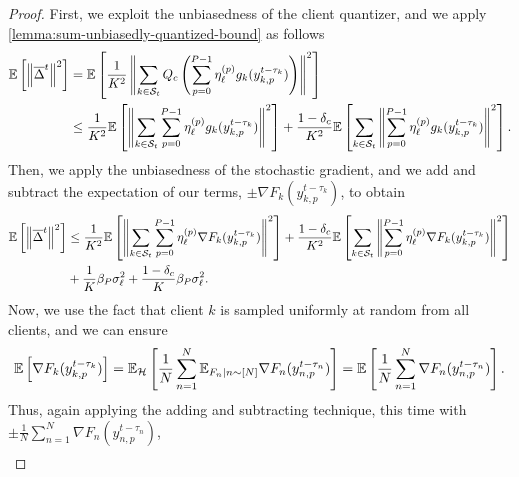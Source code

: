 \begin{proof}
    First, we exploit the unbiasedness of the client quantizer, and we apply \cref{lemma:sum-unbiasedly-quantized-bound} as follows
    \begin{equation}
        \begin{aligned}
            \mathbb{E}\left[ \left\lVert \overline{\Delta}^t \right\rVert^2 \right]
             & = \mathbb{E}\left[\frac{1}{K^2}  \left\lVert\sum_{k\in \mathcal{S}_t} Q_c \left( \sum_{p=0}^{P-1} \eta^{(p)}_{\ell} g_k(y^{t-\tau_k}_{k,p}) \right) \right\rVert^2 \right]                                                                                                            \\
             & \leq \frac{1}{K^2} \mathbb{E}\left[\left\lVert\sum_{k\in \mathcal{S}_t} \sum_{p=0}^{P-1} \eta^{(p)}_{\ell} g_k(y^{t-\tau_k}_{k,p})\right\rVert^2\right] + \frac{1-\delta_c}{K^2} \mathbb{E}\left[ \sum_{k\in \mathcal{S}_t}  \left\lVert\sum_{p=0}^{P-1} \eta^{(p)}_{\ell} g_k(y^{t-\tau_k}_{k,p}) \right\rVert^2 \right].
        \end{aligned}
    \end{equation}
    Then, we apply the unbiasedness of the stochastic gradient, and we add and subtract the expectation of our terms, $\pm \nabla F_k(y^{t-\tau_k}_{k,p})$, to obtain
    \begin{equation}
        \begin{aligned}
            \mathbb{E}\left[ \left\lVert \overline{\Delta}^t \right\rVert^2 \right]
             & \leq \frac{1}{K^2} \mathbb{E}\left[\left\lVert\sum_{k\in \mathcal{S}_t} \sum_{p=0}^{P-1} \eta^{(p)}_{\ell} \nabla F_k(y^{t-\tau_k}_{k,p})\right\rVert^2\right] + \frac{1-\delta_c}{K^2} \mathbb{E}\left[\sum_{k\in \mathcal{S}_t} \left\lVert\sum_{p=0}^{P-1} \eta^{(p)}_{\ell} \nabla F_k(y^{t-\tau_k}_{k,p}) \right\rVert^2\right] \\
             & + \frac{1}{K}\beta_P \sigma_{\ell}^2 + \frac{1-\delta_c}{K} \beta_P \sigma_{\ell}^2.
        \end{aligned}
    \end{equation}
    Now, we use the fact that client $k$ is sampled uniformly at random from all clients, and we can ensure
    \begin{equation}
        \mathbb{E}\left[ \nabla F_k(y^{t-\tau_k}_{k,p})\right] = \mathbb{E}_{\mathcal{H}} \left[ \frac{1}{N} \sum_{n = 1}^N \mathbb{E}_{F_n \mid n \sim[N]} \nabla F_n(y^{t-\tau_n}_{n,p}) \right] = \mathbb{E}\left[\frac{1}{N} \sum_{n = 1}^N \nabla F_n(y^{t-\tau_n}_{n,p})\right].
    \end{equation}
    Thus, again applying the adding and subtracting technique, this time with $\pm \frac{1}{N} \sum_{n = 1}^N \nabla F_n(y^{t-\tau_n}_{n,p}) $,
    \begin{equation}
        \begin{aligned}

\end{aligned}
\end{equation}
\end{proof}
